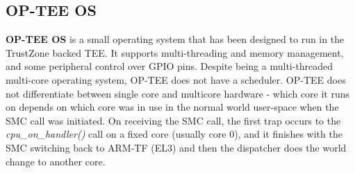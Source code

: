 


\subsection{OP-TEE OS} 
 
\textbf{OP-TEE OS} is a small operating system that has been designed to run in the TrustZone backed TEE. It supports multi-threading and memory management, and some peripheral control over GPIO pins. Despite being a multi-threaded multi-core operating system, OP-TEE does not have a scheduler. OP-TEE does not differentiate between single core and multicore hardware - which core it runs on depends on which core was in use in the normal world user-space when the SMC call was initiated. On receiving the SMC call, the first trap occurs to the \textit{cpu\_on\_handler()} call on a fixed core (usually core 0), and it finishes with the SMC switching back to ARM-TF (EL3) and then the dispatcher does the world change to another core. 

